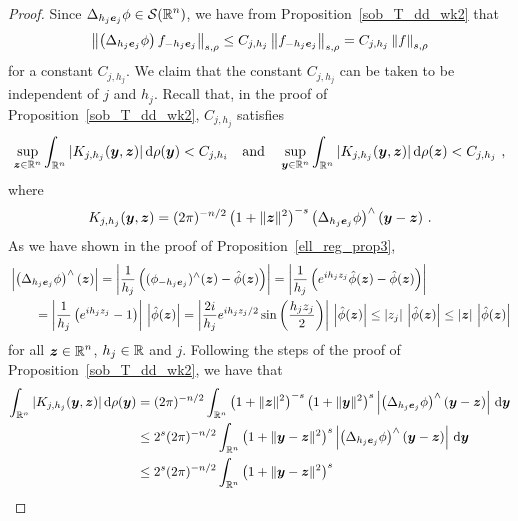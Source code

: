 \begin{proof}
Since $\displaystyle \Delta_{h_j{\bm{e}}_j} \phi \in \mathcal{S}(\mathbb{R}^n)$, we have
from Proposition~\ref{sob_T_dd_wk2} that
\[
\left\| \left( \Delta_{h_j{\bm{e}}_j} \phi \right) f_{-h_j{\bm{e}}_j}
\right\|_{s,\rho}
\leq C_{j,h_j} \left\| f_{-h_j{\bm{e}}_j} \right\|_{s,\rho}
= C_{j,h_j} \left\| f \right\|_{s,\rho}
\]
for a constant $C_{j,h_j}$.  We claim that the constant $C_{j,h_j}$ can be taken
to be independent of $j$ and $h_j$.  Recall that, in the proof of
Proposition~\ref{sob_T_dd_wk2}, $C_{j,h_j}$ satisfies 
\begin{equation} \label{DeltaBoundOpEq1}
\sup_{{\bm{z}}\in\mathbb{R}^n}
\int_{\mathbb{R}^n} |K_{j,h_j}({\bm{y}},{\bm{z}})|\,\mathrm{d}{\rho({\bm{y}})} < C_{j,h_i} \quad
\text{and} \quad
\sup_{{\bm{y}}\in\mathbb{R}^n}
\int_{\mathbb{R}^n} |K_{j,h_j}({\bm{y}},{\bm{z}})|\,\mathrm{d}{\rho({\bm{z}})} < C_{j,h_j} \ ,
\end{equation}
where
\[
K_{j,h_j}(\VEC{y},\VEC{z}) =(2\pi)^{-n/2} \left(1+\|\VEC{z}\|^2\right)^{-s}
\left(\Delta_{h_j\VEC{e}_j} \phi\right)^\wedge(\VEC{y} - \VEC{z}) \ .
\]
As we have shown in the proof of Proposition~\ref{ell_reg_prop3}, 
\begin{align*}
&\left| \left(\Delta_{h_j{\bm{e}}_j} \phi\right)^\wedge({\bm{z}}) \right|
= \left| \frac{1}{h_j} \left( (\phi_{-h_j{\bm{e}}_j})^\wedge({\bm{z}})
- \hat{\phi}({\bm{z}}) \right)\right|
= \left|\frac{1}{h_j} \left( e^{ih_jz_j} \hat{\phi}({\bm{z}})
- \hat{\phi}({\bm{z}}) \right)\right| \\
&\qquad = \left|\frac{1}{h_j} \left( e^{ih_jz_j} - 1 \right)\right|\,
\left| \hat{\phi}({\bm{z}})\right|
= \left| \frac{2i}{h_j} e^{ih_jz_j/2} \sin\left(\frac{h_jz_j}{2}\right)\right|\,
\left|\hat{\phi}({\bm{z}})\right|
\leq |z_j|\, \left|\hat{\phi}({\bm{z}})\right|
\leq |{\bm{z}}| \, \left|\hat{\phi}({\bm{z}})\right|
\end{align*}
for all $\displaystyle {\bm{z}} \in \mathbb{R}^n$, $h_j \in \mathbb{R}$ and $j$.
Following the steps of the proof of Proposition~\ref{sob_T_dd_wk2}, we
have that
\begin{align*}
\int_{\RR^n}|K_{j,h_j}(\VEC{y},\VEC{z})| \dx{\rho(\VEC{y})}
&= (2\pi)^{-n/2} \int_{\RR^n} \left(1+\|\VEC{z}\|^2\right)^{-s}
\left(1+\|\VEC{y}\|^2\right)^{s}
\left| \left(\Delta_{h_j\VEC{e}_j} \phi\right)^\wedge
(\VEC{y} - \VEC{z})\right|\dx{\VEC{y}} \\
&\leq 2^s (2\pi)^{-n/2} \int_{\RR^n} \left(1+\|\VEC{y}-\VEC{z}\|^2\right)^{s}
\left|\left(\Delta_{h_j\VEC{e}_j} \phi\right)^\wedge
(\VEC{y} - \VEC{z})\right|\dx{\VEC{y}} \\
&\leq 2^s (2\pi)^{-n/2} \int_{\RR^n} \left(1+\|\VEC{y}-\VEC{z}\|^2\right)^{s}

\end{align*}
\end{proof}
